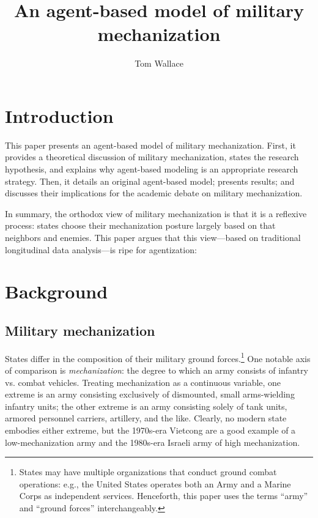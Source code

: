 \documentclass{article}
\title{An agent-based model of military mechanization}
\author{Tom Wallace}
\begin{document}
\maketitle

\section{Introduction}

This paper presents an agent-based model of military mechanization. First, it
provides a theoretical discussion of military mechanization, states the research
hypothesis, and explains why agent-based modeling is an appropriate research strategy.
Then, it details an original agent-based model; presents results; and discusses
their implications for the academic debate on military mechanization.

In summary, the orthodox view of military mechanization is that it is a
reflexive process: states choose their mechanization posture largely based on
that neighbors and enemies. This paper argues
that this view---based on traditional longitudinal data analysis---is ripe for
agentization: 

\section{Background}

\subsection{Military mechanization}

States differ in the composition of their military ground forces.\footnote{States may have multiple organizations that
conduct ground combat operations: e.g., the United States operates both an Army
and a Marine Corps as independent services. Henceforth, this paper uses the
terms ``army'' and ``ground forces'' interchangeably.} One notable axis of comparison 
is \textit{mechanization}: the degree to which an army consists of infantry 
vs. combat vehicles. Treating mechanization as a continuous variable, 
one extreme is an army consisting exclusively of dismounted, small 
arms-wielding infantry units; the other extreme is an army consisting 
solely of tank units, armored personnel carriers, artillery, and the like.
Clearly, no modern state embodies either extreme, but the 1970s-era Vietcong are
a good example of a low-mechanization army and the 1980s-era Israeli army of
high mechanization.
\end{document}
